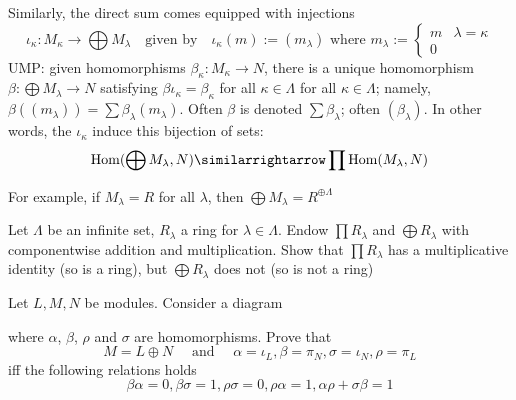 \documentclass[11pt]{article}
\begin{document}
Similarly, the direct sum comes equipped with injections
\begin{equation*}
\iota_\kappa:M_\kappa\to\bigoplus M_\lambda\quad\text{given by}\quad
\iota_\kappa(m):=(m_\lambda)\text{ where }m_\lambda:=
\begin{cases}
m&\lambda=\kappa\\
0
\end{cases}
\end{equation*}
UMP: given homomorphisms \(\beta_\kappa:M_\kappa\to N\), there is a unique
homomorphism
\(\beta:\bigoplus M_\lambda\to N\) satisfying
\(\beta\iota_\kappa=\beta_\kappa\) for all \(\kappa\in\Lambda\) for all
\(\kappa\in\Lambda\); namely,
\(\beta((m_\lambda))=\sum\beta_\lambda(m_\lambda)\). Often \(\beta\) is denoted
\(\sum\beta_\lambda\); often \((\beta_\lambda)\). In other words, the
\(\iota_\kappa\) induce this bijection of sets:
\begin{equation*}
\Hom(\bigoplus M_\lambda,N)\similarrightarrow\prod\Hom(M_\lambda,N)
\end{equation*}

For example, if \(M_\lambda=R\) for all \(\lambda\), then \(\bigoplus
   M_\lambda=R^{\oplus\Lambda}\)

\begin{exercise}
\label{4.14}
Let \(\Lambda\) be an infinite set, \(R_\lambda\) a ring for \(\lambda\in\Lambda\).
Endow \(\prod R_\lambda\) and \(\bigoplus R_\lambda\) with componentwise
addition and multiplication. Show that \(\prod R_\lambda\) has a
multiplicative identity (so is a ring), but \(\bigoplus R_\lambda\) does not
(so is not a ring)
\end{exercise}

\begin{exercise}
\label{4.15}
Let \(L,M,N\) be modules. Consider a diagram
\begin{center}
\end{center}
where \(\alpha\), \(\beta\), \(\rho\) and \(\sigma\) are homomorphisms. Prove that
\begin{equation*}
M=L\oplus N \quad\text{ and }\quad\alpha=\iota_L,\beta=\pi_N,\sigma=\iota_N,\rho=\pi_L
\end{equation*}
iff the following relations holds
\begin{equation*}
\beta\alpha=0,\beta\sigma=1,\rho\sigma=0,\rho\alpha=1,\alpha\rho+\sigma\beta=1
\end{equation*}
\end{exercise}
\end{document}
